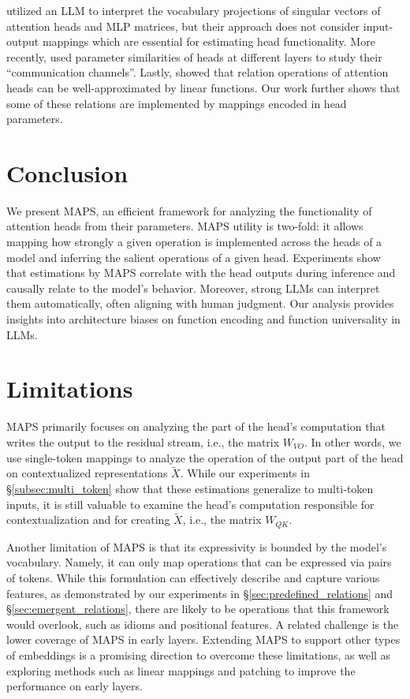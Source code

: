 \documentclass[11pt]{article}
\newcommand{\framework}{\textsc{MAPS}}
\begin{document}
\citet{svd-interpretable} utilized an LLM to interpret the vocabulary projections of singular vectors of attention heads and MLP matrices, but their approach does not consider input-output mappings which are essential for estimating head functionality. More recently, \citet{merullo2024talking} used parameter similarities of heads at different layers to study their ``communication channels''. Lastly, \citet{hernandez2024linearity} showed that relation operations of attention heads can be well-approximated by linear functions. Our work further shows that some of these relations are implemented by mappings encoded in head parameters. 



 
\section{Conclusion}
We present \framework{}, an efficient framework for analyzing the functionality of attention heads from their parameters. \framework{} utility is two-fold: it allows mapping how strongly a given operation is implemented across the heads of a model and inferring the salient operations of a given head. Experiments show that estimations by \framework{} correlate with the head outputs during inference and causally relate to the model's behavior. Moreover, strong LLMs can interpret them automatically, often aligning with human judgment. Our analysis provides insights into architecture biases on function encoding and function universality in LLMs.


\section*{Limitations}

\framework{} primarily focuses on analyzing the part of the head's computation that writes the output to the residual stream, i.e., the matrix $W_{VO}$. In other words, we use single-token mappings to analyze the operation of the output part of the head on contextualized representations $\tilde{X}$. While our experiments in \S\ref{subsec:multi_token} show that these estimations generalize to multi-token inputs, it is still valuable to examine the head's computation responsible for contextualization and for creating $\tilde{X}$, i.e., the matrix $W_{QK}$.

Another limitation of \framework{} is that its expressivity is bounded by the model's vocabulary. Namely, it can only map operations that can be expressed via pairs of tokens. While this formulation can effectively describe and capture various features, as demonstrated by our experiments in \S\ref{sec:predefined_relations} and \S\ref{sec:emergent_relations}, there are likely to be operations that this framework would overlook, such as idioms and positional features. 
A related challenge is the lower coverage of \framework{} in early layers. 
Extending \framework{} to support other types of embeddings is a promising direction to overcome these limitations, as well as exploring methods such as linear mappings \cite{yom-din-etal-2024-jump} and patching \cite{ghandeharioun2024patchscopes} to improve the performance on early layers.
\end{document}
